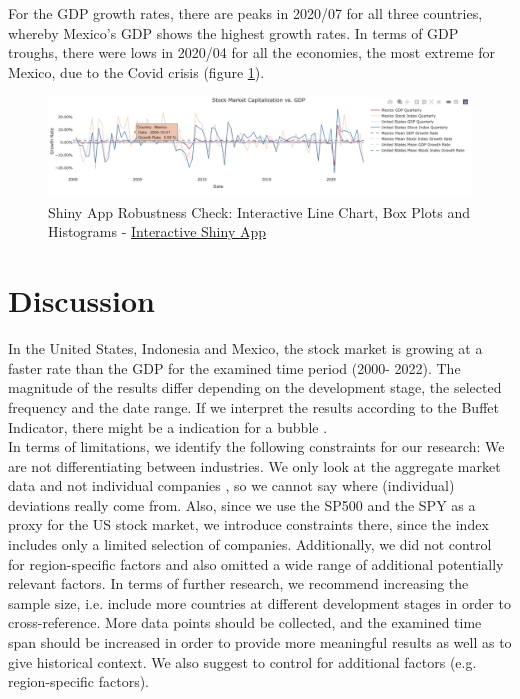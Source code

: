 \documentclass[12pt,a4paper,english]{article}
\begin{document}
For the GDP growth rates, there are peaks in 2020/07 for all three countries, whereby Mexico's GDP shows the highest growth rates. In terms of GDP troughs, there were lows in 2020/04 for all the economies, the most extreme for Mexico, due to the Covid crisis (figure \ref{robustness_linechart}). 



\begin{figure}[H]
    \centering
    \includegraphics[width=15cm]{reports/figures/robustness_linechart.png}
    \caption{Shiny App Robustness Check: Interactive Line Chart, Box Plots and Histograms - \href{https://flurinaschneider.shinyapps.io/DTFF22/}{Interactive Shiny App}}
\label{robustness_linechart}
\end{figure}

\newpage
\section{Discussion}
In the United States, Indonesia and Mexico, the stock market is growing at a faster rate than the GDP for the examined time period (2000- 2022). The magnitude of the results differ depending on the development stage, the selected frequency and the date range. If we interpret the results according to the Buffet Indicator, there might be a indication for a bubble \cite{buffet}.\\


\indent In terms of limitations, we identify the following constraints for our research: We are not differentiating between industries. We only look at the aggregate market data and not individual companies , so we cannot say where (individual) deviations really come from. Also, since we use the SP500 and the SPY as a proxy for the US stock market, we introduce constraints there, since the index includes only a limited selection of companies. Additionally, we did not control for region-specific factors and also omitted a wide range of additional potentially relevant factors. 
In terms of further research, we recommend increasing the sample size, i.e. include more countries at different development stages in order to cross-reference. More data points should be collected, and the examined time span should be increased in order to provide more meaningful results as well as to give  historical context. We also suggest to control for additional factors (e.g. region-specific factors). 
\end{document}
